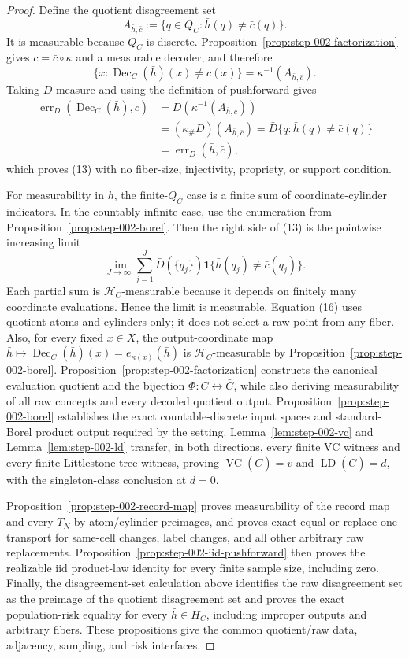 \begin{proof}
Define the quotient disagreement set
\[
A_{\bar h,\bar c}:=\{q\in Q_C:\bar h(q)\ne\bar c(q)\}.
\tag{14}
\]
It is measurable because \(Q_C\) is discrete. Proposition~\ref{prop:step-002-factorization}
gives \(c=\bar c\circ\kappa\) and a measurable decoder, and therefore
\[
\{x:\operatorname{Dec}_C(\bar h)(x)\ne c(x)\}
=\kappa^{-1}(A_{\bar h,\bar c}).
\tag{15}
\]
Taking \(D\)-measure and using the definition of pushforward gives
\[
\begin{aligned}
\operatorname{err}_D(\operatorname{Dec}_C(\bar h),c)
&=D(\kappa^{-1}(A_{\bar h,\bar c}))\\
&=(\kappa_\#D)(A_{\bar h,\bar c})
=\bar D\{q:\bar h(q)\ne\bar c(q)\}\\
&=\operatorname{err}_{\bar D}(\bar h,\bar c),
\end{aligned}
\]
which proves (13) with no fiber-size, injectivity, propriety, or support
condition.

For measurability in \(\bar h\), the finite-\(Q_C\) case is a finite sum of
coordinate-cylinder indicators. In the countably infinite case, use the
enumeration from Proposition~\ref{prop:step-002-borel}. Then the right side
of (13) is the pointwise increasing limit
\[
\lim_{J\to\infty}
\sum_{j=1}^J \bar D(\{q_j\})
\mathbf 1\{\bar h(q_j)\ne\bar c(q_j)\}.
\tag{16}
\]
Each partial sum is \(\mathcal H_C\)-measurable because it depends on finitely
many coordinate evaluations. Hence the limit is measurable. Equation (16)
uses quotient atoms and cylinders only; it does not select a raw point from
any fiber. Also, for every fixed \(x\in X\), the output-coordinate map
\(\bar h\mapsto\operatorname{Dec}_C(\bar h)(x)=e_{\kappa(x)}(\bar h)\) is
\(\mathcal H_C\)-measurable by Proposition~\ref{prop:step-002-borel}.
Proposition~\ref{prop:step-002-factorization} constructs the canonical
evaluation quotient and the bijection \(\Phi:C\leftrightarrow\bar C\), while
also deriving measurability of all raw concepts and every decoded quotient
output. Proposition~\ref{prop:step-002-borel} establishes the exact
countable-discrete input spaces and standard-Borel product output required by
the setting. Lemma~\ref{lem:step-002-vc} and
Lemma~\ref{lem:step-002-ld} transfer, in both directions, every finite VC
witness and every finite Littlestone-tree witness, proving
\(\operatorname{VC}(\bar C)=v\) and \(\operatorname{LD}(\bar C)=d\), with
the singleton-class conclusion at \(d=0\).

Proposition~\ref{prop:step-002-record-map} proves measurability of the record
map and every \(T_N\) by atom/cylinder preimages, and proves exact
equal-or-replace-one transport for same-cell changes, label changes, and all
other arbitrary raw replacements. Proposition~\ref{prop:step-002-iid-pushforward}
then proves the realizable iid product-law identity for every finite sample
size, including zero. Finally, the disagreement-set calculation above identifies
the raw disagreement set as the preimage of the quotient disagreement set
and proves the exact population-risk equality for every \(\bar h\in H_C\),
including improper outputs and arbitrary fibers. These propositions give the
common quotient/raw data, adjacency, sampling, and risk interfaces.




\end{proof}
